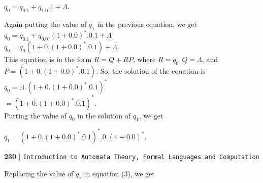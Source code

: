 \documentclass[9pt]{article}
\begin{document}
\vspace*{0.1cm}
\hspace*{4.4cm} $q_0 = q_0.1 + q_1.0.1 + \Lambda.$ \\

\vspace*{0.1cm}

\hspace*{0.5cm} Again putting the value of $q_1$ in the previous equation, we get\\

\vspace*{0.1cm}
\hspace*{3cm} $q_0 = q_0.1 + q_0.0. (1 + 0.0)^*.0.1 + \Lambda$ \\

\hspace*{3cm} $q_0 = q_0(1 + 0.(1 + 0.0)^*.0.1) + \Lambda.$ \\

\vspace*{0.1cm}
\hspace*{0.5cm} This equation is in the form $R = Q + RP$, where $R = q_0, Q = \Lambda$, and $P = (1 + 0.(1 + 0.0)^*.0.1)$. So, the
solution of the equation is\\

\hspace*{3cm} $q_0 = \Lambda.(1 + 0.(1 + 0.0)^*.0.1)^*$ \\
\hspace*{3.4cm} $= (1 + 0.(1 + 0.0)^*.0.1)^*.$ \\

\vspace*{0.1cm}
Putting the value of $q_0$ in the solution of $q_1$, we get\\
\vspace*{0.1cm}

\hspace*{2.5cm} $q_1 = (1 + 0.(1 + 0.0)^*.0.1)^*.0. (1 + 0.0)^*.$ \\

\newpage
\begin{flushleft}
    \textbf{230}\hspace*{0.1cm} \textbf{$|$} \hspace*{0.1cm} \texttt{Introduction to Automata Theory, Formal Languages and Computation}
  \end{flushleft}

  \vspace*{0.5cm}

 \hspace*{0.5cm} Replacing the value of $q_1$ in equation (3), we get\\
\end{document}
